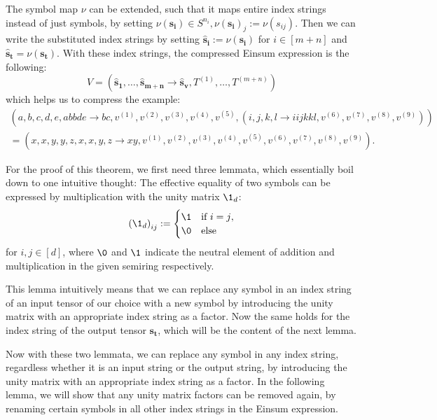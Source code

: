 \begin{theorem}
    The symbol map $\nu$ can be extended, such that it maps entire index strings instead of just symbols, by setting $\nu(\bm{s_i}) \in S^{n_i}, \nu(\bm{s_i})_j := \nu(s_{ij})$.
    Then we can write the substituted index strings by setting $\bm{\hat{s}_i} := \nu(\bm{s_i})$ for $i \in [m + n]$ and $\bm{\hat{s}_t} = \nu(\bm{s_t})$.
    With these index strings, the compressed Einsum expression is the following:
    $$V = (\bm{\hat{s}_1}, \dots, \bm{\hat{s}_{m + n}} \rightarrow \bm{\hat{s}_v}, T^{(1)},\dots,T^{(m + n)})$$
    which helps us to compress the example:
    \begin{gather*}
        (a,b,c,d,e,abbde \rightarrow bc, v^{(1)}, v^{(2)}, v^{(3)}, v^{(4)}, v^{(5)}, (
        i,j,k,l \rightarrow iijkkl, v^{(6)}, v^{(7)}, v^{(8)}, v^{(9)}
        ))\\
        =(x,x,y,y,z,x,x,y,z \rightarrow xy, v^{(1)}, v^{(2)}, v^{(3)}, v^{(4)}, v^{(5)}, v^{(6)}, v^{(7)}, v^{(8)}, v^{(9)}).
    \end{gather*}
\end{theorem}

\bigskip
For the proof of this theorem, we first need three lemmata, which essentially boil down to one intuitive thought:
The effective equality of two symbols can be expressed by multiplication with the unity matrix $\1_d$:
$$\left(\1_d\right)_{ij} := \begin{cases}
        \1 & \text{if $i = j$}, \\
        \0 & \text{else}
    \end{cases}$$
for $i,j \in [d]$, where $\0$ and $\1$ indicate the neutral element of addition and multiplication in the given semiring respectively.



This lemma intuitively means that we can replace any symbol in an index string of an input tensor of our choice with a new symbol by introducing the unity matrix with an appropriate index string as a factor.
Now the same holds for the index string of the output tensor $\bm{s_t}$, which will be the content of the next lemma.



Now with these two lemmata, we can replace any symbol in any index string, regardless whether it is an input string or the output string, by introducing the unity matrix with an appropriate index string as a factor.
In the following lemma, we will show that any unity matrix factors can be removed again, by renaming certain symbols in all other index strings in the Einsum expression.

